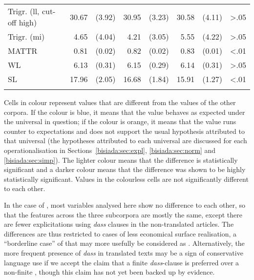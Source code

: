 \documentclass[output=paper]{LSP/langsci}
\begin{document}
\begin{table}[b]
\begin{tabular}{ld{2}@{ }d{2}d{2}@{ }d{2}d{2}@{ }d{2}r}
  Trigr. (ll, cut-off high) & 30.67 & (3.92)   & 30.95                   & (3.23)   & 30.58                     & (4.11)                      & >.05\\
  Trigr. (mi)               & 4.65  & (4.04)   & 4.21                    & (3.05)   & 5.55                      & (4.22)                      & >.05\\
  \midrule
  MATTR                     & 0.81 & (0.02)  & 0.82                    & (0.02)                    & 0.83  & (0.01)  & <.01\\
  WL                        & 6.13                     & (0.31)                      & 6.15                    & (0.29)                    & 6.14  & (0.31)  & >.05\\
  SL                        & 17.96  & (2.05)    & 16.68 & (1.84)  & 15.91 & (1.27)  & <.01\\
  \lspbottomrule
  \end{tabular}
\end{table}

Cells in colour represent values that are different from the values of the other corpora. If the colour is blue, it means that the value behaves as expected under the universal in question; if the colour is orange, it means that the value runs counter to expectations and does not support the usual hypothesis attributed to that universal (the hypotheses attributed to each universal are discussed for each operationalisation in Sections~\ref{bisiada:sec:expl}, \ref{bisiada:sec:norm} and \ref{bisiada:sec:simp}). The lighter colour means that the difference is statistically significant and a darker colour means that the difference was shown to be highly statistically significant. Values in the colourless cells are not significantly different to each other.

In the case of , most variables analysed here show no difference to each other, so that the features across the three subcorpora are mostly the same, except there are fewer explicitations using \emph{dass} clauses in the non-translated articles. The differences are thus restricted to cases of less economical surface realisation, a \enquote{borderline case} of  that may more usefully be considered as . Alternatively, the more frequent presence of \emph{dass} in translated texts may be a sign of conservative language use if we accept the claim that a  finite \emph{dass}-clause is preferred over a non-finite  \parencites[215]{fischer97}[337]{fischer13}, though this claim has not yet been backed up by evidence.
\end{document}

